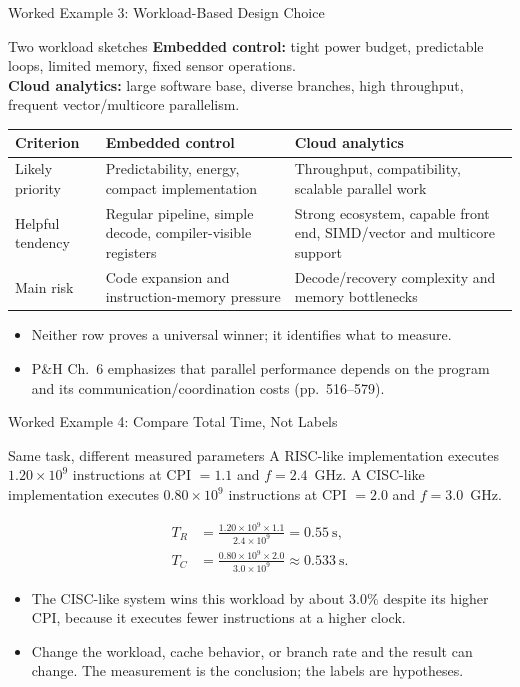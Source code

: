 \documentclass[aspectratio=169]{beamer}
\begin{document}
\begin{frame}{Worked Example 3: Workload-Based Design Choice}
  \scriptsize
  \begin{exampleblock}{Two workload sketches}
    \textbf{Embedded control:} tight power budget, predictable loops, limited
    memory, fixed sensor operations.\\
    \textbf{Cloud analytics:} large software base, diverse branches, high
    throughput, frequent vector/multicore parallelism.
  \end{exampleblock}
  \begin{tabular}{@{}p{3.0cm}p{4.0cm}p{4.0cm}@{}}
    \toprule
    \textbf{Criterion} & \textbf{Embedded control} & \textbf{Cloud analytics}\\
    \midrule
    Likely priority & Predictability, energy, compact implementation & Throughput, compatibility, scalable parallel work\\
    Helpful tendency & Regular pipeline, simple decode, compiler-visible registers & Strong ecosystem, capable front end, SIMD/vector and multicore support\\
    Main risk & Code expansion and instruction-memory pressure & Decode/recovery complexity and memory bottlenecks\\
    \bottomrule
  \end{tabular}
  \vspace{0.15cm}
  \begin{itemize}
    \item Neither row proves a universal winner; it identifies what to measure.
    \item P\&H Ch.~6 emphasizes that parallel performance depends on the
      program and its communication/coordination costs (pp.~516--579).
  \end{itemize}
\end{frame}

\begin{frame}{Worked Example 4: Compare Total Time, Not Labels}
  \begin{exampleblock}{Same task, different measured parameters}
    A RISC-like implementation executes $1.20\times10^9$ instructions at
    CPI $=1.1$ and $f=2.4$~GHz. A CISC-like implementation executes
    $0.80\times10^9$ instructions at CPI $=2.0$ and $f=3.0$~GHz.
  \end{exampleblock}
  \begin{align*}
    T_R &= \frac{1.20\times10^9\times1.1}{2.4\times10^9}
         = 0.55~\text{s},\\
    T_C &= \frac{0.80\times10^9\times2.0}{3.0\times10^9}
         \approx 0.533~\text{s}.
  \end{align*}
  \begin{itemize}
    \item The CISC-like system wins this workload by about $3.0\%$ despite
      its higher CPI, because it executes fewer instructions at a higher clock.
    \item Change the workload, cache behavior, or branch rate and the result
      can change. The measurement is the conclusion; the labels are hypotheses.
  \end{itemize}
\end{frame}
\end{document}
